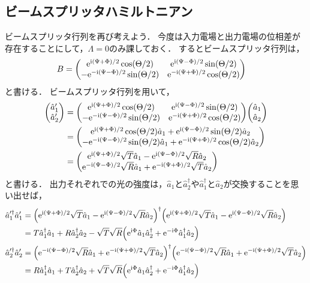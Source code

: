 \documentclass{report}
\begin{document}
  \subsection{ビームスプリッタハミルトニアン}
    ビームスプリッタ行列を再び考えよう．
    今度は入力電場と出力電場の位相差が存在することにして，$\Lambda = 0$のみ課しておく．
    するとビームスプリッタ行列は，
    \begin{align}
      B &= \mqty(
        \e^{\i(\Psi + \Phi) / 2}\cos(\Theta / 2) & \e^{\i(\Psi - \Phi) / 2}\sin(\Theta / 2) \\ 
        -\e^{-\i(\Psi - \Phi) / 2}\sin(\Theta / 2) & \e^{-\i(\Psi + \Phi) / 2}\cos(\Theta / 2)
      )
    \end{align}
    と書ける．
    ビームスプリッタ行列を用いて，
    \begin{align}
      \mqty(\hat{a}_1' \\ \hat{a}_2')
      &= \mqty(
        \e^{\i(\Psi + \Phi) / 2}\cos(\Theta / 2) & \e^{\i(\Psi - \Phi) / 2}\sin(\Theta / 2) \\ 
        -\e^{-\i(\Psi - \Phi) / 2}\sin(\Theta / 2) & \e^{-\i(\Psi + \Phi) / 2}\cos(\Theta / 2) \\ 
      )\mqty(\hat{a}_1 \\ \hat{a}_2) \\ 
      &= \mqty(
        \e^{\i(\Psi + \Phi) / 2}\cos(\Theta / 2)\hat{a}_1 + \e^{\i(\Psi - \Phi) / 2}\sin(\Theta / 2)\hat{a}_2 \\ 
        -\e^{-\i(\Psi - \Phi) / 2}\sin(\Theta / 2)\hat{a}_1 + \e^{-\i(\Psi + \Phi) / 2}\cos(\Theta / 2)\hat{a}_2 \\ 
      ) \\ 
      &= \mqty(
        \e^{\i(\Psi + \Phi) / 2}\sqrt{T}\hat{a}_1 - \e^{\i(\Psi - \Phi) / 2}\sqrt{R}\hat{a}_2 \\ 
        \e^{-\i(\Psi - \Phi) / 2}\sqrt{R}\hat{a}_1 + \e^{-\i(\Psi + \Phi) / 2}\sqrt{T}\hat{a}_2 \\ 
      )
    \end{align}
    と書ける．
    出力それぞれでの光の強度は，$\hat{a}_1$と$\hat{a}_2^{\dag}$や$\hat{a}_1^{\dag}$と$\hat{a}_2$が交換することを思い出せば，
    \begin{align}
      \hat{a}_1'^{\dag}\hat{a}_1' &= \qty(\mathrm{e}^{\mathrm{i}(\Psi + \Phi) / 2}\sqrt{T}\hat{a}_1 - \mathrm{e}^{\mathrm{i}(\Psi - \Phi) / 2}\sqrt{R}\hat{a}_2)^{\dag}\qty(\mathrm{e}^{\mathrm{i}(\Psi + \Phi) / 2}\sqrt{T}\hat{a}_1 - \mathrm{e}^{\mathrm{i}(\Psi - \Phi) / 2}\sqrt{R}\hat{a}_2) \\ 
      &= T\hat{a}_1^{\dag}\hat{a}_1 + R \hat{a}_2^{\dag}\hat{a}_2 - \sqrt{T}\sqrt{R}\qty(\mathrm{e}^{\mathrm{i}\Phi}\hat{a}_1\hat{a}_2^{\dag} + \mathrm{e}^{-\mathrm{i}\Phi}\hat{a}_1^{\dag}\hat{a}_2)\label{power-a1} \\ 
      \hat{a}_2'^{\dag}\hat{a}_2' &= \qty(\mathrm{e}^{-\mathrm{i}(\Psi - \Phi) / 2}\sqrt{R}\hat{a}_1 + \mathrm{e}^{-\mathrm{i}(\Psi + \Phi) / 2}\sqrt{T}\hat{a}_2)^{\dag}\qty(\mathrm{e}^{-\mathrm{i}(\Psi - \Phi) / 2}\sqrt{R}\hat{a}_1 + \mathrm{e}^{-\mathrm{i}(\Psi + \Phi) / 2}\sqrt{T}\hat{a}_2) \\ 
      &= R\hat{a}_1^{\dag}\hat{a}_1 + T\hat{a}_2^{\dag}\hat{a}_2 + \sqrt{T}\sqrt{R}\qty(\mathrm{e}^{\mathrm{i}\Phi}\hat{a}_1\hat{a}_2^{\dag} + \mathrm{e}^{-\mathrm{i}\Phi}\hat{a}_1^{\dag}\hat{a}_2)\label{power-a2}
    \end{align}
\end{document}
